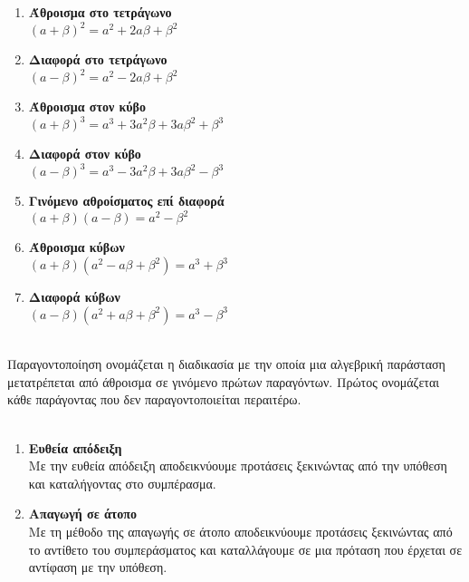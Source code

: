 \documentclass[twoside,nofonts,internet,shmeiwseis]{thewria}
\begin{document}
\begin{multicols}{2}
\begin{enumerate}[itemsep=0mm,label=\bf\arabic*.]
\item \parbox[t]{7cm}{\textbf{Άθροισμα στο τετράγωνο}\\$ (a+\beta)^2=a^2+2a\beta+\beta^2 $}
\item \parbox[t]{7cm}{\textbf{Διαφορά στο τετράγωνο}\\$ (a-\beta)^2=a^2-2a\beta+\beta^2 $}
\item \parbox[t]{7cm}{\textbf{Άθροισμα στον κύβο}\\$ (a+\beta)^3=a^3+3a^2\beta+3a\beta^2+\beta^3 $}
\item \parbox[t]{7cm}{\textbf{Διαφορά στον κύβο}\\$ (a-\beta)^3=a^3-3a^2\beta+3a\beta^2-\beta^3 $}
\item \parbox[t]{7cm}{\textbf{Γινόμενο αθροίσματος επί διαφορά}\\$ (a+\beta)(a-\beta)=a^2-\beta^2 $}
\item \parbox[t]{7cm}{\textbf{Άθροισμα κύβων}\\$ (a+\beta)\left(a^2-a\beta+\beta^2 \right)=a^3+\beta^3 $}
\item \parbox[t]{7cm}{\textbf{Διαφορά κύβων}\\$ (a-\beta)\left(a^2+a\beta+\beta^2 \right)=a^3-\beta^3 $}
\end{enumerate}
\end{multicols}\mbox{}\\
\newpage
\noindent
{}
Παραγοντοποίηση ονομάζεται η διαδικασία με την οποία μια αλγεβρική παράσταση μετατρέπεται από άθροισμα σε γινόμενο πρώτων παραγόντων. Πρώτος ονομάζεται κάθε παράγοντας που δεν παραγοντοποιείται περαιτέρω.\\\\
\vspace{-5mm}
\begin{enumerate}[label=\bf\arabic*.]
\item \textbf{Ευθεία απόδειξη}\\
Με την ευθεία απόδειξη αποδεικνύουμε προτάσεις ξεκινώντας από την υπόθεση και καταλήγοντας στο συμπέρασμα.
\item \textbf{Απαγωγή σε άτοπο}\\
Με τη μέθοδο της απαγωγής σε άτοπο αποδεικνύουμε προτάσεις ξεκινώντας από το αντίθετο του συμπεράσματος και καταλλάγουμε σε μια πρόταση που έρχεται σε αντίφαση με την υπόθεση.
\end{enumerate}
\end{document}
